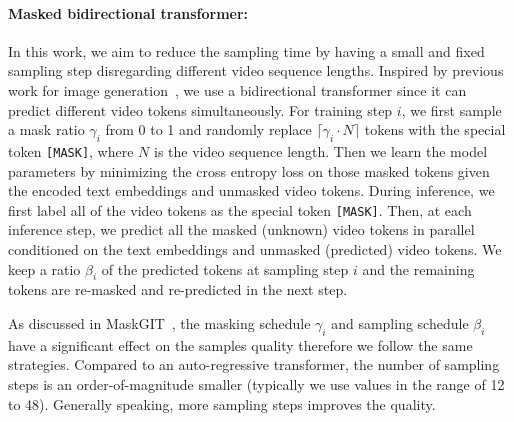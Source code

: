\paragraph{Masked bidirectional transformer:}

In this work, we aim to reduce the sampling time by having a small and fixed sampling step disregarding different video sequence lengths. Inspired by previous work for image generation~\citep{MASKGIT}, we use a bidirectional transformer since it can predict different video tokens simultaneously. For training step $i$, we first sample a mask ratio $\gamma_{i}$ from 0 to 1 and randomly replace $\lceil \gamma_{i} \cdot N \rceil$ tokens with the special token \texttt{[MASK]}, where $N$ is the video sequence length. Then
we learn the model parameters by minimizing the cross entropy loss on those masked tokens given the encoded text embeddings and unmasked video tokens. During inference, we first label all of the video tokens as the special token \texttt{[MASK]}. Then, at each inference step, we predict all the masked (unknown) video tokens in parallel conditioned on the text embeddings and unmasked (predicted) video tokens. We keep a ratio $\beta_{i}$ of the predicted tokens at sampling step $i$ and the remaining tokens are re-masked and re-predicted in the next step. 

As discussed in MaskGIT~\citep{MASKGIT}, the masking schedule $\gamma_{i}$ and sampling schedule $\beta_{i}$ have a significant effect on the samples quality therefore we follow the same strategies. Compared to an auto-regressive transformer, the number of sampling steps is an order-of-magnitude smaller (typically we use values in the range of 12 to 48). Generally speaking, more sampling steps improves the quality.

